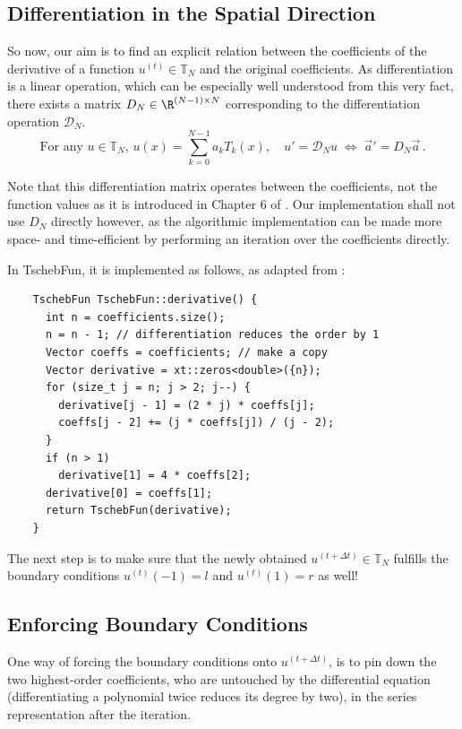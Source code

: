 \documentclass[12pt, a4paper]{article}
\newcommand{\tschebfun}{\textcolor{themecolor3}{TschebFun}\xspace}
\begin{document}
  \subsection{Differentiation in the Spatial Direction}
  So now, our aim is to find an explicit relation between the coefficients of the derivative of a function $u^{(t)} \in \mathbb{T}_N$ and the original coefficients.
  As differentiation is a linear operation, which can be especially well understood from this very fact, there exists a matrix $D_N \in \R^{(N-1) \times N}$ corresponding to the differentiation operation $\mathcal{D}_N$.
  $$\text{For any } u \in \mathbb{T}_N,\, u(x) = \sum_{k=0}^{N-1} a_k T_k(x), \quad u' = \mathcal{D}_N u \;\Leftrightarrow\; \vec{a}' = D_N \vec{a} \,.$$

  Note that this differentiation matrix operates between the coefficients, not the function values as it is introduced in Chapter 6 of \cite{spectralmethods}.
  Our implementation shall not use $D_N$ directly however, as the algorithmic implementation can be made more space- and time-efficient by performing an iteration over the coefficients directly.

  In \tschebfun, it is implemented as follows, as adapted from \cite{numpy}:
  \begin{verbatim}
    TschebFun TschebFun::derivative() {
      int n = coefficients.size();
      n = n - 1; // differentiation reduces the order by 1
      Vector coeffs = coefficients; // make a copy
      Vector derivative = xt::zeros<double>({n});
      for (size_t j = n; j > 2; j--) {
        derivative[j - 1] = (2 * j) * coeffs[j];
        coeffs[j - 2] += (j * coeffs[j]) / (j - 2);
      }
      if (n > 1)
        derivative[1] = 4 * coeffs[2];
      derivative[0] = coeffs[1];
      return TschebFun(derivative);
    }
  \end{verbatim}

  The next step is to make sure that the newly obtained $u^{(t+\Delta t)} \in \mathbb{T}_N$ fulfills the boundary conditions $u^{(t)}(-1) = l$ and $u^{(t)}(1) = r$ as well!

  \subsection{Enforcing Boundary Conditions}
  One way of forcing the boundary conditions onto $u^{(t+\Delta t)}$, is to pin down the two highest-order coefficients, who are untouched by the differential equation (differentiating a polynomial twice reduces its degree by two), in the series representation after the iteration.
\end{document}
